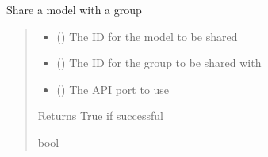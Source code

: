 \documentclass[letterpaper,10pt,english]{sphinxmanual}
\begin{document}
\begin{fulllineitems}
\begin{fulllineitems}
\label{\detokenize{aisquared.platform:aisquared.platform.AISquaredPlatformClient.AISquaredPlatformClient.share_model_with_group}}
\pysigstartsignatures
{}
\pysigstopsignatures
\sphinxAtStartPar
Share a model with a group
\begin{quote}\begin{description}
\begin{itemize}
\item {} 
\sphinxAtStartPar
{} () \textendash{} The ID for the model to be shared

\item {} 
\sphinxAtStartPar
{} () \textendash{} The ID for the group to be shared with

\item {} 
\sphinxAtStartPar
{} (\sphinxstyleliteralemphasis{\sphinxupquote{ (}}\sphinxstyleliteralemphasis{\sphinxupquote{)}}) \textendash{} The API port to use

\end{itemize}

\sphinxAtStartPar
{} \textendash{} Returns True if successful

\sphinxAtStartPar
bool

\end{description}\end{quote}

\end{fulllineitems}



\end{fulllineitems}
\end{document}
